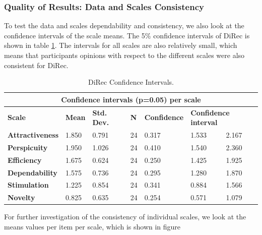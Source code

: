 \subsubsection{Quality of Results: Data and Scales Consistency}
To test the data and scales dependability and consistency, we also look at
the confidence intervals of the scale means. The 5\% confidence intervals of
DiRec is shown in table \ref{table:table57}. The intervals for all scales are
also relatively small, which means that participants opinions with respect to
the different scales were also consistent for DiRec.
\begin{table}[!htbp]
\tiny
\centering
\begin{tabular}{|l|l|l|l|l|l|l|}
\hline
\multicolumn{7}{|c|}{\textbf{Confidence intervals (p=0.05) per scale}}         
\\\hline \textbf{Scale}          & \textbf{Mean} & \textbf{Std. Dev.} &
\textbf{N} &\textbf{Confidence} & \multicolumn{2}{l|}{\textbf{Confidence interval}} \\\hline \textbf{Attractiveness} & 1.850         & 0.791              & 24         &0.317               & 1.533                   & 2.167                  \\\hline 
\textbf{Perspicuity}    & 1.950         & 1.026              & 24         &
0.410               & 1.540                   & 2.360                 \\\hline
\textbf{Efficiency}     & 1.675         & 0.624              & 24         &
0.250               & 1.425                   & 1.925                 \\\hline
\textbf{Dependability}  & 1.575         & 0.736              & 24         &
0.295               & 1.280                   & 1.870                 \\\hline
\textbf{Stimulation}    & 1.225         & 0.854              & 24         &
0.341               & 0.884                   & 1.566                 \\\hline
\textbf{Novelty}        & 0.825         & 0.635              & 24         &
0.254               & 0.571                   & 1.079  \\\hline
\end{tabular}
\caption{DiRec Confidence Intervals.}
\label{table:table57}
\end{table}
For further investigation of the consistency of individual scales, we look at
the means values per item per scale, which is shown in figure
